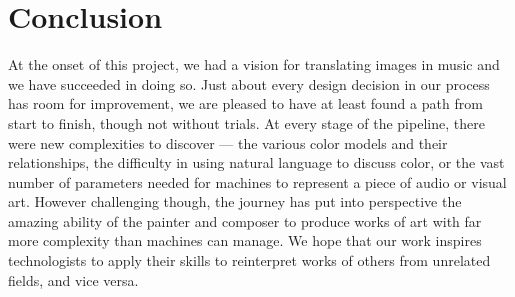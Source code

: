 \documentclass[10pt, conference, compsocconf]{IEEEtran}
\begin{document}
\section{Conclusion}

At the onset of this project, we had a vision for translating images
in music and we have succeeded in doing so.  Just about every design
decision in our process has room for improvement, we are pleased to
have at least found a path from start to finish, though not without
trials.  At every stage of the pipeline, there were new complexities
to discover --- the various color models and their relationships, the
difficulty in using natural language to discuss color, or the vast
number of parameters needed for machines to represent a piece of audio
or visual art.  However challenging though, the journey has put into
perspective the amazing ability of the painter and composer to produce
works of art with far more complexity than machines can manage.  We
hope that our work inspires technologists to apply their skills to
reinterpret works of others from unrelated fields, and vice versa.



\end{document}
